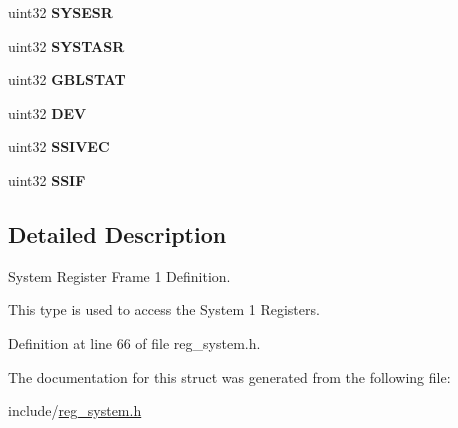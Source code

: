 \begin{DoxyCompactItemize}
\item 
\mbox{\label{structsystemBase1_a5346ca6662d205b73fd568a4a76a9ca7}} 
uint32 {\bfseries S\+Y\+S\+E\+SR}
\item 
\mbox{\label{structsystemBase1_a282e2bcb3e0aee5164b9f502ebd20ca8}} 
uint32 {\bfseries S\+Y\+S\+T\+A\+SR}
\item 
\mbox{\label{structsystemBase1_a0d2ad92539770283def8e875969f3ecf}} 
uint32 {\bfseries G\+B\+L\+S\+T\+AT}
\item 
\mbox{\label{structsystemBase1_ad4b4ccf3e527b462b211be03022acd78}} 
uint32 {\bfseries D\+EV}
\item 
\mbox{\label{structsystemBase1_a97fae1348ca4de0bc9f59815275989e9}} 
uint32 {\bfseries S\+S\+I\+V\+EC}
\item 
\mbox{\label{structsystemBase1_aac002bd127f1b06ebf191707be241681}} 
uint32 {\bfseries S\+S\+IF}
\end{DoxyCompactItemize}


\subsection{Detailed Description}
System Register Frame 1 Definition. 

This type is used to access the System 1 Registers. 

Definition at line 66 of file reg\+\_\+system.\+h.



The documentation for this struct was generated from the following file\+:\begin{DoxyCompactItemize}
\item 
include/\mbox{\hyperlink{reg__system_8h}{reg\+\_\+system.\+h}}\end{DoxyCompactItemize}
